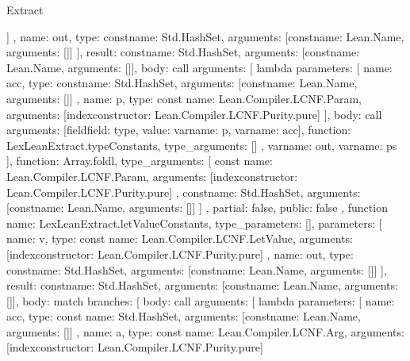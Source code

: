 \begin{lexlean}{Extract}
\begin{toolingmodule}
{{{{{              }
            ]
          }
        },
        {
          name: out,
          type: const{name: Std.HashSet, arguments: [const{name: Lean.Name, arguments: []}]}
        }
      ],
      result: const{name: Std.HashSet, arguments: [const{name: Lean.Name, arguments: []}]},
      body: call{
        arguments: [
          lambda{
            parameters: [
              {
                name: acc,
                type: const{name: Std.HashSet, arguments: [const{name: Lean.Name, arguments: []}]}
              },
              {
                name: p,
                type: const{
                  name: Lean.Compiler.LCNF.Param,
                  arguments: [index{constructor: Lean.Compiler.LCNF.Purity.pure}]
                }
              }
            ],
            body: call{
              arguments: [field{field: type, value: var{name: p}}, var{name: acc}],
              function: LexLeanExtract.typeConstants,
              type_arguments: []
            }
          },
          var{name: out},
          var{name: ps}
        ],
        function: Array.foldl,
        type_arguments: [
          const{
            name: Lean.Compiler.LCNF.Param,
            arguments: [index{constructor: Lean.Compiler.LCNF.Purity.pure}]
          },
          const{name: Std.HashSet, arguments: [const{name: Lean.Name, arguments: []}]}
        ]
      },
      partial: false,
      public: false
    },
    function{
      name: LexLeanExtract.letValueConstants,
      type_parameters: [],
      parameters: [
        {
          name: v,
          type: const{
            name: Lean.Compiler.LCNF.LetValue,
            arguments: [index{constructor: Lean.Compiler.LCNF.Purity.pure}]
          }
        },
        {
          name: out,
          type: const{name: Std.HashSet, arguments: [const{name: Lean.Name, arguments: []}]}
        }
      ],
      result: const{name: Std.HashSet, arguments: [const{name: Lean.Name, arguments: []}]},
      body: match{
        branches: [
          {
            body: call{
              arguments: [
                lambda{
                  parameters: [
                    {
                      name: acc,
                      type: const{
                        name: Std.HashSet,
                        arguments: [const{name: Lean.Name, arguments: []}]
                      }
                    },
                    {
                      name: a,
                      type: const{
                        name: Lean.Compiler.LCNF.Arg,
                        arguments: [index{constructor: Lean.Compiler.LCNF.Purity.pure}]
}}}}}}}}
\end{toolingmodule}
\end{lexlean}

